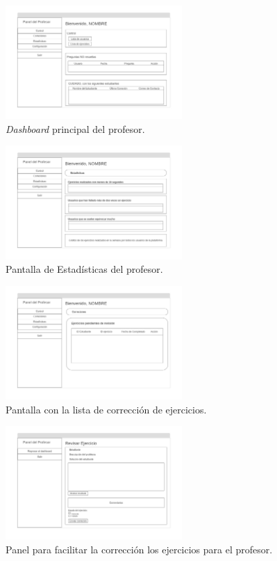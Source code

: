 \begin{figure}[H]
    \centering
    \includegraphics[width=0.6\textwidth]{imagenes/Mockups/11-Profesor-Principal.png}
    \caption{\textit{Dashboard} principal del profesor.}
\end{figure}

\begin{figure}[H]
    \centering
    \includegraphics[width=0.6\textwidth]{imagenes/Mockups/12-Profesor-Estadisticas.png}
    \caption{Pantalla de Estadísticas del profesor.}
\end{figure}

\begin{figure}[H]
    \centering
    \includegraphics[width=0.6\textwidth]{imagenes/Mockups/13-Profesor-Corregir.png}
    \caption{Pantalla con la lista de corrección de ejercicios.}
\end{figure}

\begin{figure}[H]
    \centering
    \includegraphics[width=0.6\textwidth]{imagenes/Mockups/14-Profesor-Corregir-Ejercicio.png}
    \caption{Panel para facilitar la corrección los ejercicios para el profesor.}
\end{figure}

